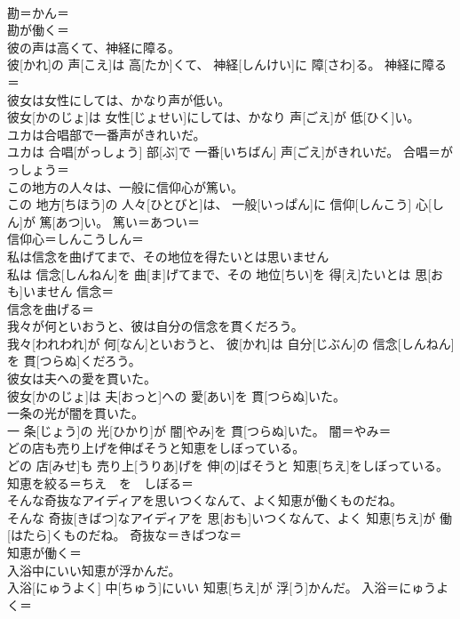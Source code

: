 \documentclass[8pt]{extreport}
\begin{document}
\begin{CJK}{UTF8}{min}
\\	勘＝かん＝ 
\\	勘が働く＝ 
\\	彼の声は高くて、神経に障る。	
\\	彼[かれ]の 声[こえ]は 高[たか]くて、 神経[しんけい]に 障[さわ]る。	神経に障る＝ 
\\	彼女は女性にしては、かなり声が低い。	
\\	彼女[かのじょ]は 女性[じょせい]にしては、かなり 声[ごえ]が 低[ひく]い。	
\\	ユカは合唱部で一番声がきれいだ。	
\\	ユカは 合唱[がっしょう] 部[ぶ]で 一番[いちばん] 声[ごえ]がきれいだ。	合唱＝がっしょう＝ 
\\	この地方の人々は、一般に信仰心が篤い。	
\\	この 地方[ちほう]の 人々[ひとびと]は、 一般[いっぱん]に 信仰[しんこう] 心[しん]が 篤[あつ]い。	篤い＝あつい＝ 
\\	信仰心＝しんこうしん＝ 
\\	私は信念を曲げてまで、その地位を得たいとは思いません	
\\	私は 信念[しんねん]を 曲[ま]げてまで、その 地位[ちい]を 得[え]たいとは 思[おも]いません	信念＝ 
\\	信念を曲げる＝ 
\\	我々が何といおうと、彼は自分の信念を貫くだろう。	
\\	我々[われわれ]が 何[なん]といおうと、 彼[かれ]は 自分[じぶん]の 信念[しんねん]を 貫[つらぬ]くだろう。	
\\	彼女は夫への愛を貫いた。	
\\	彼女[かのじょ]は 夫[おっと]への 愛[あい]を 貫[つらぬ]いた。	
\\	一条の光が闇を貫いた。	
\\	一 条[じょう]の 光[ひかり]が 闇[やみ]を 貫[つらぬ]いた。	闇＝やみ＝ 
\\	どの店も売り上げを伸ばそうと知恵をしぼっている。	
\\	どの 店[みせ]も 売り上[うりあ]げを 伸[の]ばそうと 知恵[ちえ]をしぼっている。	知恵を絞る＝ちえ　を　しぼる＝ 
\\	そんな奇抜なアイディアを思いつくなんて、よく知恵が働くものだね。	
\\	そんな 奇抜[きばつ]なアイディアを 思[おも]いつくなんて、よく 知恵[ちえ]が 働[はたら]くものだね。	奇抜な＝きばつな＝ 
\\	知恵が働く＝ 
\\	入浴中にいい知恵が浮かんだ。	
\\	入浴[にゅうよく] 中[ちゅう]にいい 知恵[ちえ]が 浮[う]かんだ。	入浴＝にゅうよく＝ 

\end{CJK}
\end{document}
